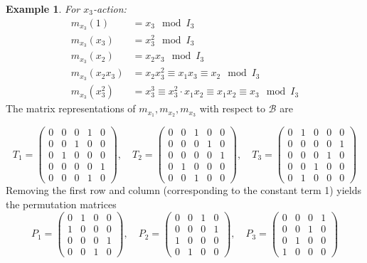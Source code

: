 \documentclass[11pt]{amsart}
\theoremstyle{plain}
\theoremstyle{definition}
\newtheorem{ex}[theorem]{Example}
\theoremstyle{remark}
\begin{document}
\begin{ex}
	\noindent \textit{For \( x_3 \)-action:}
		\begin{align*}
			m_{x_3}(1) & = x_3 \mod I_3\\
			m_{x_3}(x_3) & = x_3^2 \mod I_3\\
			m_{x_3}(x_2) & = x_2x_3 \mod I_3\\
			m_{x_3}(x_2x_3) & = x_2x_3^2 \equiv x_1x_3 \equiv x_2 \mod I_3\\
			m_{x_3}(x_3^2) & = x_3^3 \equiv x_3^2 \cdot x_1x_2 \equiv x_1x_2 \equiv x_3 \mod I_3
		\end{align*}
	The matrix representations of \( m_{x_1}, m_{x_2}, m_{x_3} \) with respect to \( \mathcal{B} \) are
	
	\[
	T_1 =\begin{pmatrix}
	0 & 0 & 0 & 1 & 0\\ 
	0 & 0 & 1 & 0 & 0\\ 
	0 & 1 & 0 & 0 & 0\\ 
	0 & 0 & 0 & 0 & 1\\ 
	0 & 0 & 0 & 1 & 0
	\end{pmatrix}, \quad
	T_2 =\begin{pmatrix}
	0 & 0 & 1 & 0 & 0\\ 
	0 & 0 & 0 & 1 & 0\\ 
	0 & 0 & 0 & 0 & 1\\ 
	0 & 1 & 0 & 0 & 0\\ 
	0 & 0 & 1 & 0 & 0
	\end{pmatrix},\quad 
	T_3 =\begin{pmatrix}
	0 & 1 & 0 & 0 & 0\\ 
	0 & 0 & 0 & 0 & 1\\ 
	0 & 0 & 0 & 1 & 0\\ 
	0 & 0 & 1 & 0 & 0\\ 
	0 & 1 & 0 & 0 & 0
	\end{pmatrix} 
	\] 	Removing the first row and column (corresponding to the constant term 1) yields the permutation matrices 
	\[
	P_1 = \begin{pmatrix}
	0 & 1 & 0 & 0\\ 
	1 & 0 & 0 & 0\\ 
	0 & 0 & 0 & 1\\ 
	0 & 0 & 1 & 0
	\end{pmatrix}, \quad
	P_2 = \begin{pmatrix}
	0 & 0 & 1 & 0\\ 
	0 & 0 & 0 & 1\\ 
	1 & 0 & 0 & 0\\ 
	0 & 1 & 0 & 0
	\end{pmatrix},\quad 
	P_3 = \begin{pmatrix}
	0 & 0 & 0 & 1\\ 
	0 & 0 & 1 & 0\\ 
	0 & 1 & 0 & 0\\ 
	1 & 0 & 0 & 0
	\end{pmatrix} 
	\] 

\end{ex}
\end{document}
